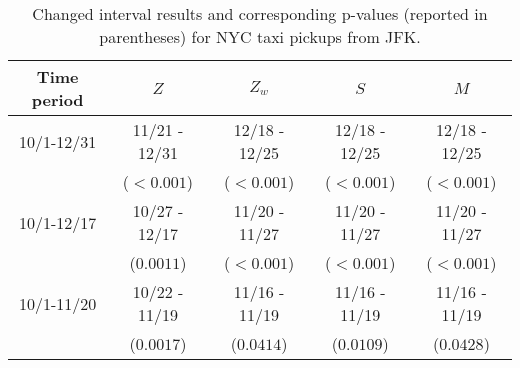 \documentclass[arxiv, preprint]{imsart}
\numberwithin{equation}{section}
\theoremstyle{plain}
\begin{document}
\begin{table}[h] \centering
\caption{Changed interval results and corresponding p-values (reported in parentheses) for NYC taxi pickups from JFK.} \label{table:pickup}

\begin{tabular}{|c|c|c|c|c| } 
 \hline
Time period & $Z$ & $Z_w$ & $S$ & $M$ \\
\hline
\hline
10/1-12/31 & 11/21 - 12/31  &  12/18 - 12/25  & 12/18 - 12/25  & 12/18 - 12/25  \\ 
& ($<0.001$)     & ($<0.001$)   & ($<0.001$)   & ($<0.001$)  \\
\hline
10/1-12/17 & 10/27 - 12/17  &  11/20 - 11/27  & 11/20 - 11/27  & 11/20 - 11/27  \\ 
& ($0.0011$)     & ($<0.001$)   & ($<0.001$)   & ($<0.001$)  \\
\hline
10/1-11/20 & 10/22 - 11/19  &  11/16 - 11/19  & 11/16 - 11/19  & 11/16 - 11/19  \\ 
& ($0.0017$)   & ($0.0414$)   & ($0.0109$)   & ($0.0428$)  \\
\hline
\end{tabular} 
\end{table}
%
\end{document}
